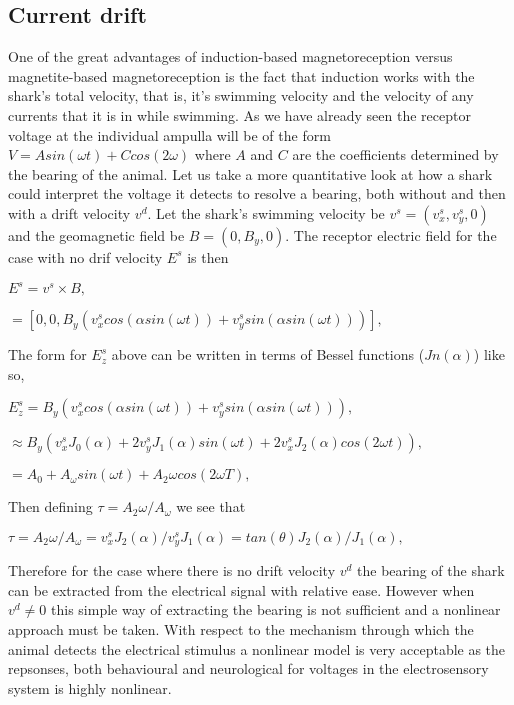\documentclass[12pt]{article}
\begin{document}
\subsection{Current drift}

One of the great advantages of induction-based magnetoreception versus magnetite-based magnetoreception is the fact that induction works with the shark's total velocity, that is, it's swimming velocity and the velocity of any currents that it is in while swimming. As we have already seen the receptor voltage at the individual ampulla will be of the form $V = Asin(\omega t) + Ccos(2\omega)$ where $A$ and $C$ are the coefficients determined by the bearing of the animal. Let us take a more quantitative look at how a shark could interpret the voltage it detects to resolve a bearing, both without and then with a drift velocity $v^d$. Let the shark's swimming velocity be $v^s = (v^s_x, v^s_y, 0)$ and the geomagnetic field be $B = (0, B_y, 0)$. The receptor electric field for the case with no drif velocity $E^s$ is then 

\vspace{4mm}
$E^s = v^s \times  B,$


      $ = [0, 0, B_y(v^s_x cos(\alpha sin(\omega t)) + v^s_y sin(\alpha sin(\omega t)))],$

\vspace{4mm}

The form for $E^s_z$ above can be written in terms of Bessel functions ($Jn(\alpha)$) like so,

\vspace{4mm}
$E^s_z =  B_y(v^s_x cos(\alpha sin(\omega t)) + v^s_y sin(\alpha sin(\omega t))),$

$\approx B_y(v^s_x J_0 (\alpha) + 2v^s_y J_1 (\alpha) sin(\omega t) + 2v^s_x J_2 (\alpha) cos(2\omega t)),$

$= A_0 + A_\omega sin(\omega t) + A_2\omega cos(2\omega T),$

\vspace{4mm}

Then defining $\tau = A_2\omega / A_\omega$ we see that

\vspace{4mm}
 $\tau = A_2\omega / A_\omega = v^s_x J_2 (\alpha)/v^s_y J_1 (\alpha) = tan(\theta) J_2 (\alpha)/ J_1 (\alpha),$

\vspace{4mm}
Therefore for the case where there is no drift velocity $v^d$ the bearing of the shark can be extracted from the electrical signal with relative ease. However when $v^d \neq 0$ this simple way of extracting the bearing is not sufficient and a nonlinear approach must be taken. With respect to the mechanism through which the animal detects the electrical stimulus a nonlinear model is very acceptable as the repsonses, both behavioural and neurological for voltages in the electrosensory system is highly nonlinear. 
\end{document}

